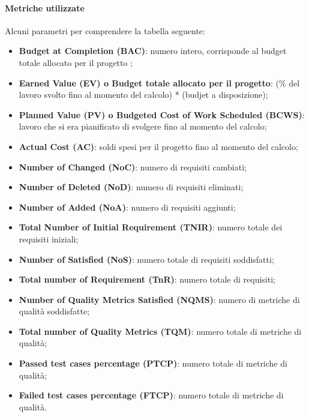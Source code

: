 \paragraph{Metriche utilizzate}
Alcuni parametri per comprendere la tabella seguente:
\begin{itemize}
	\item \textbf{Budget at Completion (BAC)}: numero intero, corrisponde al budget totale allocato per il progetto ;

	\item \textbf{Earned Value (EV) o Budget totale allocato per il progetto}: (\% del lavoro svolto fino al momento del calcolo) * (budjet a disposizione);
	
	\item \textbf{Planned Value (PV) o Budgeted Cost of Work Scheduled (BCWS)}: lavoro che si era pianificato di svolgere fino al momento del calcolo;
	
	\item \textbf{Actual Cost (AC)}: soldi spesi per il progetto fino al momento del calcolo;
	
	\item \textbf{Number of Changed (NoC)}: numero di requisiti cambiati;
	
	\item \textbf{Number of Deleted (NoD)}: numero di requisiti eliminati;
	
	\item \textbf{Number of Added (NoA)}: numero di requisiti aggiunti;
	
	\item \textbf{Total Number of Initial Requirement (TNIR)}: numero totale dei requisiti iniziali;
	
	\item \textbf{Number of Satisfied (NoS)}: numero totale di requisiti soddisfatti;
	
	\item \textbf{Total number of Requirement (TnR)}: numero totale di requisiti;
	
	\item \textbf{Number of Quality Metrics Satisfied (NQMS)}: numero di metriche di qualità soddisfatte;
	
	\item \textbf{Total number of Quality Metrics (TQM)}: numero totale di metriche di qualità;
	
	\item \textbf{Passed test cases percentage (PTCP)}: numero totale di metriche di qualità;
	
	\item \textbf{Failed test cases percentage (FTCP)}: numero totale di metriche di qualità.
	
\end{itemize}

